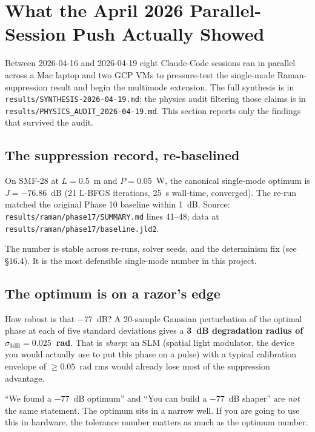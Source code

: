 \documentclass[12pt,a4paper]{article}
\begin{document}
\section{What the April 2026 Parallel-Session Push Actually Showed}
\label{sec:april2026-companion}

Between 2026-04-16 and 2026-04-19 eight Claude-Code sessions ran in
parallel across a Mac laptop and two GCP VMs to pressure-test the
single-mode Raman-suppression result and begin the multimode
extension. The full synthesis is in
\texttt{results/SYNTHESIS-2026-04-19.md}; the physics audit filtering
those claims is in \texttt{results/PHYSICS\_AUDIT\_2026-04-19.md}.
This section reports only the findings that survived the audit.

\subsection{The suppression record, re-baselined}

On SMF-28 at $L = 0.5$~m and $P = 0.05$~W, the canonical
single-mode optimum is $J = -76.86$~dB (21 L-BFGS iterations, 25~s
wall-time, converged). The re-run matched the original Phase 10
baseline within 1~dB. Source: \texttt{results/raman/phase17/SUMMARY.md}
lines 41--48; data at \texttt{results/raman/phase17/baseline.jld2}.

\begin{intuition}
The number is stable across re-runs, solver seeds, and the determinism
fix (see §16.4). It is the most defensible single-mode number in
this project.
\end{intuition}

\subsection{The optimum is on a razor's edge}

How robust is that $-77$~dB? A 20-sample Gaussian perturbation of the
optimal phase at each of five standard deviations gives a \textbf{3~dB
degradation radius of $\sigma_{3\text{dB}} = 0.025$~rad}. That is
\emph{sharp}: an SLM (spatial light modulator, the device you would
actually use to put this phase on a pulse) with a typical calibration
envelope of $\geq 0.05$~rad rms would already lose most of the
suppression advantage.

\begin{warning}
``We found a $-77$~dB optimum'' and ``You can build a $-77$~dB shaper''
are \emph{not} the same statement. The optimum sits in a narrow well.
If you are going to use this in hardware, the tolerance number matters
as much as the optimum number.
\end{warning}
\end{document}
